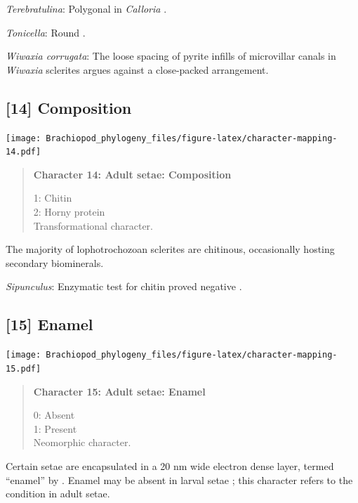 \documentclass[openany]{book}
\begin{document}
\hypertarget{Terebratulina-coding-13}{}
\emph{Terebratulina}: Polygonal in \emph{Calloria} \citep{Luter2000}.

\hypertarget{Tonicella-coding-13}{}
\emph{Tonicella}: Round \citep{Fischer1980}.

\hypertarget{Wiwaxia_corrugata-coding-13}{}
\emph{Wiwaxia corrugata}: The loose spacing of pyrite infills of
microvillar canals in \emph{Wiwaxia} sclerites \citep{Smith2014} argues
against a close-packed arrangement.

\subsection*{{[}14{]} Composition}\label{composition}

\texttt{[image: Brachiopod\_phylogeny\_files/figure-latex/character-mapping-14.pdf]}

\begin{quote}
\textbf{Character 14: Adult setae: Composition}

1: Chitin\\
2: Horny protein\\
Transformational character.
\end{quote}

The majority of lophotrochozoan sclerites are chitinous, occasionally
hosting secondary biominerals.

\hypertarget{Sipunculus-coding-14}{}
\emph{Sipunculus}: Enzymatic test for chitin proved negative
\citep{Rice1993}.

\subsection*{{[}15{]} Enamel}\label{enamel}

\texttt{[image: Brachiopod\_phylogeny\_files/figure-latex/character-mapping-15.pdf]}

\begin{quote}
\textbf{Character 15: Adult setae: Enamel}

0: Absent\\
1: Present\\
Neomorphic character.
\end{quote}

Certain setae are encapsulated in a 20 nm wide electron dense layer,
termed ``enamel'' by \citet{Gustus1973}. Enamel may be absent in larval
setae \citep{Luter2003}; this character refers to the condition in adult
setae.
\end{document}

